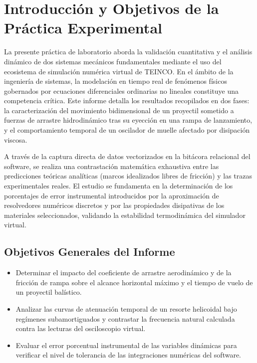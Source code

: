 \documentclass[11pt,a4paper]{article}
\begin{document}
	\section{Introducción y Objetivos de la Práctica Experimental}
	La presente práctica de laboratorio aborda la validación cuantitativa y el análisis dinámico de dos sistemas mecánicos fundamentales mediante el uso del ecosistema de simulación numérica virtual de TEINCO. En el ámbito de la ingeniería de sistemas, la modelación en tiempo real de fenómenos físicos gobernados por ecuaciones diferenciales ordinarias no lineales constituye una competencia crítica. Este informe detalla los resultados recopilados en dos fases: la caracterización del movimiento bidimensional de un proyectil sometido a fuerzas de arrastre hidrodinámico tras su eyección en una rampa de lanzamiento, y el comportamiento temporal de un oscilador de muelle afectado por disipación viscosa.
	
	A través de la captura directa de datos vectorizados en la bitácora relacional del software, se realiza una contrastación matemática exhaustiva entre las predicciones teóricas analíticas (marcos idealizados libres de fricción) y las trazas experimentales reales. El estudio se fundamenta en la determinación de los porcentajes de error instrumental introducidos por la aproximación de resolvedores numéricos discretos y por las propiedades disipativas de los materiales seleccionados, validando la estabilidad termodinámica del simulador virtual.
	
	\subsection{Objetivos Generales del Informe}
	\begin{itemize}
		\item Determinar el impacto del coeficiente de arrastre aerodinámico y de la fricción de rampa sobre el alcance horizontal máximo y el tiempo de vuelo de un proyectil balístico.
		\item Analizar las curvas de atenuación temporal de un resorte helicoidal bajo regímenes subamortiguados y contrastar la frecuencia natural calculada contra las lecturas del osciloscopio virtual.
		\item Evaluar el error porcentual instrumental de las variables dinámicas para verificar el nivel de tolerancia de las integraciones numéricas del software.
	\end{itemize}
	
\end{document}

